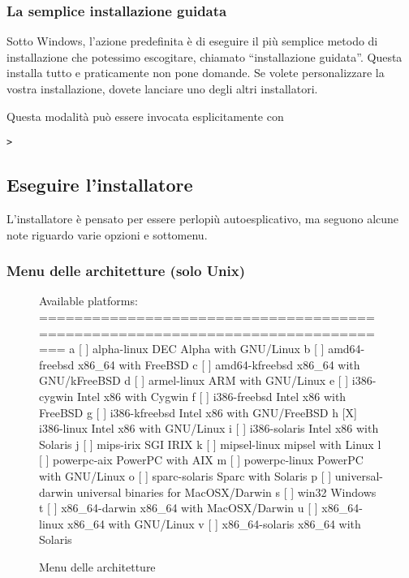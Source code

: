 \documentclass{article}
\begin{document}
\subsubsection{La semplice installazione guidata}

Sotto Windows, l'azione predefinita è di eseguire il più semplice metodo
di installazione che potessimo escogitare, chiamato ``installazione
guidata''. Questa installa tutto e praticamente non pone domande. Se
volete personalizzare la vostra installazione, dovete lanciare uno degli
altri installatori.

Questa modalità può essere invocata esplicitamente con
\begin{alltt}
> 
\end{alltt}


\subsection{Eseguire l'installatore}
\label{sec:runinstall}

L'installatore è pensato per essere perlopiù autoesplicativo, ma seguono
alcune note riguardo varie opzioni e sottomenu.

\subsubsection{Menu delle architetture (solo Unix)}
\label{sec:binary}

\begin{figure}[tb]
\begin{boxedverbatim}
Available platforms:
===============================================================================
   a [ ] alpha-linux      DEC Alpha with GNU/Linux
   b [ ] amd64-freebsd    x86_64 with FreeBSD
   c [ ] amd64-kfreebsd   x86_64 with GNU/kFreeBSD
   d [ ] armel-linux      ARM with GNU/Linux
   e [ ] i386-cygwin      Intel x86 with Cygwin
   f [ ] i386-freebsd     Intel x86 with FreeBSD
   g [ ] i386-kfreebsd    Intel x86 with GNU/FreeBSD
   h [X] i386-linux       Intel x86 with GNU/Linux
   i [ ] i386-solaris     Intel x86 with Solaris
   j [ ] mips-irix        SGI IRIX
   k [ ] mipsel-linux     mipsel with Linux
   l [ ] powerpc-aix      PowerPC with AIX
   m [ ] powerpc-linux    PowerPC with GNU/Linux
   o [ ] sparc-solaris    Sparc with Solaris
   p [ ] universal-darwin universal binaries for MacOSX/Darwin
   s [ ] win32            Windows
   t [ ] x86_64-darwin    x86_64 with MacOSX/Darwin
   u [ ] x86_64-linux     x86_64 with GNU/Linux
   v [ ] x86_64-solaris   x86_64 with Solaris
\end{boxedverbatim}
\caption{Menu delle architetture}\label{fig:bin-text}
\end{figure}
\end{document}

